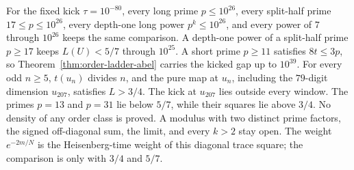 \begin{theorem}
For the fixed kick \(\tau=10^{-80}\), every long prime \(p\le10^{26}\),
every split-half prime \(17\le p\le10^{26}\), every depth-one long power
\(p^k\le10^{26}\), and every power of \(7\) through \(10^{26}\) keeps the
same comparison. A depth-one power of a split-half prime \(p\ge17\) keeps
\(L(U)<5/7\) through \(10^{25}\). A short prime \(p\ge11\) satisfies
\(8t\le3p\), so Theorem~\ref{thm:order-ladder-abel} carries the kicked gap
up to \(10^{39}\). For every odd \(n\ge5\), \(t(u_n)\) divides \(n\), and
the pure map at \(u_n\), including the \(79\)-digit dimension \(u_{207}\),
satisfies \(L>3/4\). The kick at \(u_{207}\) lies outside every window.
The primes \(p=13\) and \(p=31\) lie below \(5/7\), while their squares
lie above \(3/4\). No density of any order class is proved. A modulus
with two distinct prime factors, the signed off-diagonal sum, the limit,
and every \(k>2\) stay open. The weight \(e^{-2m/N}\) is the
Heisenberg-time weight of this diagonal trace square; the comparison is
only with \(3/4\) and \(5/7\).
\end{theorem}
